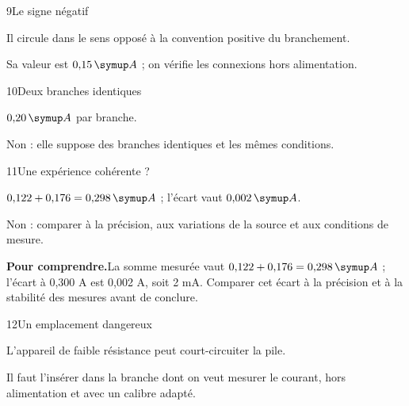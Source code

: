 \par\noindent\begin{minipage}{\linewidth}
\begin{corrige}{9}{Le signe négatif}
\begin{questions}
\item Il circule dans le sens opposé à la convention positive du branchement.
\item Sa valeur est $0{,}15\unite A$ ; on vérifie les connexions hors alimentation.
\end{questions}
\end{corrige}
\end{minipage}
\par\noindent\begin{minipage}{\linewidth}
\begin{corrige}{10}{Deux branches identiques}
\begin{questions}
\item $0{,}20\unite A$ par branche.
\item Non : elle suppose des branches identiques et les mêmes conditions.
\end{questions}
\end{corrige}
\end{minipage}
\par\noindent\begin{minipage}{\linewidth}
\begin{corrige}{11}{Une expérience cohérente ?}
\begin{questions}
\item $0{,}122+0{,}176=0{,}298\unite A$ ; l’écart vaut $0{,}002\unite A$.
\item Non : comparer à la précision, aux variations de la source et aux conditions de mesure.
\end{questions}
\par\smallskip\noindent\textbf{Pour comprendre.}\enspace La somme mesurée vaut $0{,}122+0{,}176=0{,}298\unite A$ ; l’écart à 0,300 A est 0,002 A, soit 2 mA. Comparer cet écart à la précision et à la stabilité des mesures avant de conclure.\par
\end{corrige}
\end{minipage}
\par\noindent\begin{minipage}{\linewidth}
\begin{corrige}{12}{Un emplacement dangereux}
\begin{questions}
\item L’appareil de faible résistance peut court-circuiter la pile.
\item Il faut l’insérer dans la branche dont on veut mesurer le courant, hors alimentation et avec un calibre adapté.
\end{questions}
\end{corrige}
\end{minipage}

